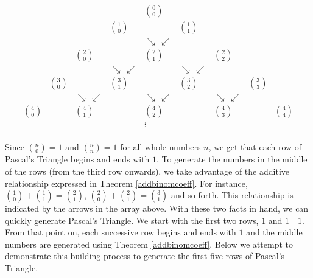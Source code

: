 \[\begin{array}{ccccccccc} 
&	&	&	&	\displaystyle{\binom{0}{0}}	&	&	&	&	\\ [5pt]
&	&	&	\displaystyle{\binom{1}{0}}	&	&	\displaystyle{\binom{1}{1}}	&	&	&\\ [5pt]
&	&	&	&	\searrow \, \swarrow &	&	&	&	\\ [5pt]
&	&	\displaystyle{\binom{2}{0}}	&	&	\displaystyle{\binom{2}{1}}	&	&	\displaystyle{\binom{2}{2}}	&	&\\ [5pt]
&                             &  & 	\searrow \, \swarrow      & & 	\searrow \, \swarrow      & &                             & \\ [5pt]
&	\displaystyle{\binom{3}{0}}	&	&	\displaystyle{\binom{3}{1}}	&	&	\displaystyle{\binom{3}{2}}	&	&	\displaystyle{\binom{3}{3}}	&	\\ [5pt]
                            &	&	\searrow \, \swarrow 	&	&	\searrow \, \swarrow 	&	&	\searrow \, \swarrow 	&	& \\ [5pt]
\displaystyle{\binom{4}{0}}	&	&	\displaystyle{\binom{4}{1}}	&	&	\displaystyle{\binom{4}{2}}	&	&	\displaystyle{\binom{4}{3}}	&	&	\displaystyle{\binom{4}{4}} \\ [5pt]
 	&	&	 	&	&	\vdots	&	&	 	&	&	  \\
\end{array} \]

Since $\binom{n}{0} = 1$ and $\binom{n}{n} = 1$ for all whole numbers $n$, we get that each row of Pascal's Triangle begins and ends with $1$. To generate the numbers in the middle of the rows (from the third row onwards), we take advantage of the additive relationship expressed in  Theorem \ref{addbinomcoeff}.  For instance, $\binom{1}{0} + \binom{1}{1} = \binom{2}{1}$, $\binom{2}{0} + \binom{2}{1} = \binom{3}{1}$ and so forth.  This relationship is indicated by the arrows in the array above. With these two facts in hand, we can quickly generate Pascal's Triangle. We start with the first two rows, $1$ and $1 \quad 1$.  From that point on, each successive row begins and ends with $1$ and the middle numbers are generated using Theorem \ref{addbinomcoeff}.  Below we attempt to demonstrate this building process to generate the first five rows of Pascal's Triangle.


